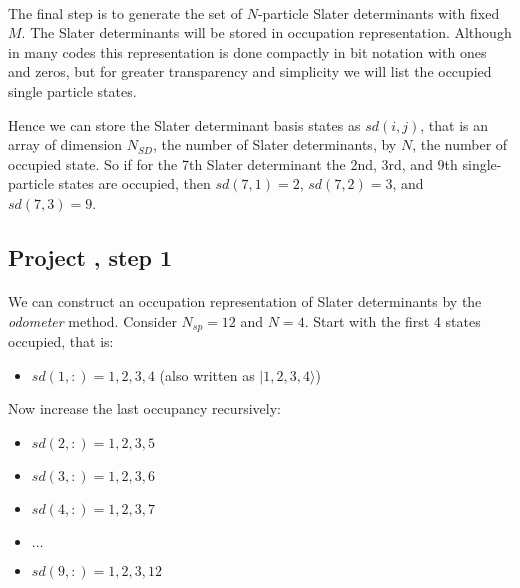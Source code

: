 \documentclass[%
twoside,                 %
final,                   %
10pt]{article}
\begin{document}
\paragraph{}
The final step is to generate the set of $N$-particle Slater determinants with fixed $M$. 
The Slater determinants will be stored in occupation representation.  Although in many codes
this representation is done compactly in bit notation with ones and zeros, but for 
greater transparency and simplicity we will list the occupied single particle states.

 Hence we can 
store the Slater determinant basis states as $sd(i,j)$, that is an 
array of dimension $N_{SD}$, the number of Slater determinants, by $N$, the number of occupied 
state. So if for the 7th Slater determinant the 2nd, 3rd, and 9th single-particle states are occupied, 
then $sd(7,1) = 2$, $sd(7,2) = 3$, and $sd(7,3) = 9$.



\subsection*{Project , step 1}

\paragraph{}

We can construct an occupation representation of Slater determinants by the \emph{odometer}
method.  Consider $N_{sp} = 12$ and $N=4$. 
Start with the first 4 states occupied, that is:

\begin{itemize}
\item $sd(1,:)= 1,2,3,4$ (also written as $|1,2,3,4 \rangle$)
\end{itemize}

\noindent
Now increase the last occupancy recursively:
\begin{itemize}
\item $sd(2,:)= 1,2,3,5$

\item $sd(3,:)= 1,2,3,6$

\item $sd(4,:)= 1,2,3,7$

\item $\ldots$

\item $sd(9,:)= 1,2,3,12$
\end{itemize}
\end{document}
